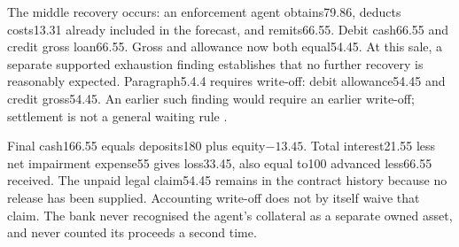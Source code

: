 The middle recovery occurs: an enforcement agent obtains79.86, deducts
costs13.31 already included in the forecast, and remits66.55.
Debit cash66.55 and credit gross loan66.55. Gross and allowance now both
equal54.45. At this sale, a separate supported exhaustion finding establishes
that no further recovery is reasonably expected. Paragraph5.4.4 requires
write-off: debit allowance54.45 and credit gross54.45. An earlier such
finding would require an earlier write-off; settlement is not a general
waiting rule \citep[paragraph5.4.4]{aasb9dated}.

Final cash166.55 equals deposits180 plus equity$-13.45$. Total interest21.55
less net impairment expense55 gives loss33.45, also equal to100 advanced
less66.55 received. The unpaid legal claim54.45 remains in the contract
history because no release has been supplied. Accounting write-off does not
by itself waive that claim. The bank never recognised the agent's collateral
as a separate owned asset, and never counted its proceeds a second time.
